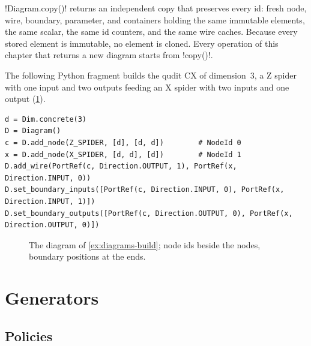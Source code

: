 \py!Diagram.copy()! returns an independent copy that preserves every id: fresh node, wire, boundary, parameter, and \bbox{} containers holding the same immutable elements, the same scalar, the same id counters, and the same wire caches. Because every stored element is immutable, no element is cloned. Every operation of this chapter that returns a new diagram starts from \py!copy()!.

\begin{example}\label{ex:diagrams-build}
The following Python fragment builds the qudit CX of dimension~$3$, a Z spider with one input and two outputs feeding an X spider with two inputs and one output (\cref{fig:diagrams-cx}).
\begin{lstlisting}[style=python]
d = Dim.concrete(3)
D = Diagram()
c = D.add_node(Z_SPIDER, [d], [d, d])        # NodeId 0
x = D.add_node(X_SPIDER, [d, d], [d])        # NodeId 1
D.add_wire(PortRef(c, Direction.OUTPUT, 1), PortRef(x, Direction.INPUT, 0))
D.set_boundary_inputs([PortRef(c, Direction.INPUT, 0), PortRef(x, Direction.INPUT, 1)])
D.set_boundary_outputs([PortRef(c, Direction.OUTPUT, 0), PortRef(x, Direction.OUTPUT, 0)])
\end{lstlisting}
\end{example}

\begin{figure}[H]
\centering
{}
\caption{The diagram of \cref{ex:diagrams-build}; node ids beside the nodes, boundary positions at the ends.}
\label{fig:diagrams-cx}
\end{figure}

\section{Generators}\label{sec:diagrams-generators}

\subsection{Policies}

